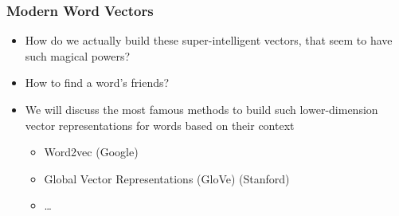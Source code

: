 \begin{frame}[fragile]\frametitle{Modern Word Vectors}
\begin{itemize}
\item How do we actually build these super-intelligent vectors, that seem to have such magical powers?
\item How to find a word's friends?
\item We will discuss the most famous methods to build such lower-dimension vector representations for words based on their context
\begin{itemize}
\item Word2vec  (Google)
\item Global Vector Representations (GloVe)   (Stanford)
\item \ldots
\end{itemize}
\end{itemize}
\end{frame}





